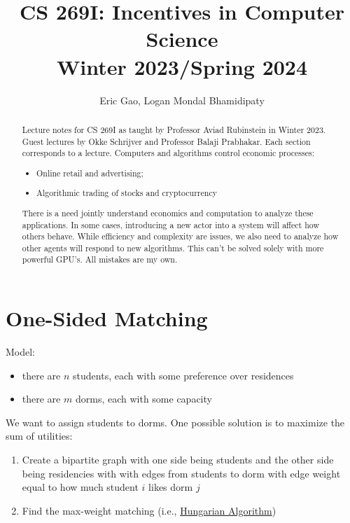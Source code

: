 \documentclass[dvipsnames]{article}
\title{CS 269I: Incentives in Computer Science \\
Winter 2023/Spring 2024}
\author{Eric Gao, Logan Mondal Bhamidipaty}
\date{}
\theoremstyle{definition}
\theoremstyle{remark}
\newenvironment{mech}[1]{\begin{tcolorbox}[colback=red!5!white,colframe=red!75!black,title={#1}]}{\end{tcolorbox}}
\begin{document}
\maketitle

\begin{abstract}
	Lecture notes for CS 269I as taught by Professor Aviad Rubinstein in Winter 2023. Guest lectures by Okke Schrijver and Professor Balaji Prabhakar. Each section corresponds to a lecture. Computers and algorithms control economic processes:
	\begin{itemize}
		\item Online retail and advertising;
		\item Algorithmic trading of stocks and cryptocurrency
	\end{itemize}
	There is a need jointly understand economics and computation to analyze these applications. In some cases, introducing a new actor into a system will affect how others behave. While efficiency and complexity are issues, we also need to analyze how other agents will respond to new algorithms. This can't be solved solely with more powerful GPU's. All mistakes are my own. 
\end{abstract}

\tableofcontents

\newpage

\section{One-Sided Matching}

Model:
\begin{itemize}
	\item there are $n$ students, each with some preference over residences 
	\item there are $m$ dorms, each with some capacity
\end{itemize}
We want to assign students to dorms. One possible solution is to maximize the sum of utilities:
\begin{mech}{Utility Maximization}
\begin{enumerate}
	\item Create a bipartite graph with one side being students and the other side being residencies with with edges from students to dorm with edge weight equal to how much student $i$ likes dorm $j$
	\item Find the max-weight matching (i.e., \href{https://en.wikipedia.org/wiki/Hungarian_algorithm}{Hungarian Algorithm})
\end{enumerate}
\end{mech}
\end{document}
